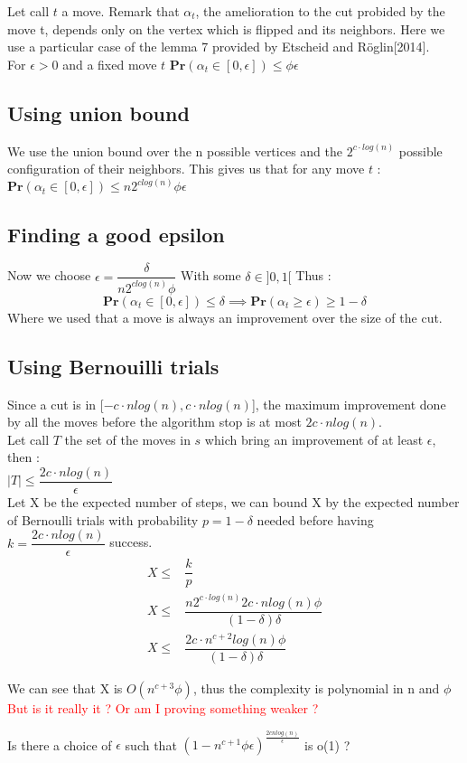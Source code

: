 \documentclass[12pt]{article}
\begin{document}
Let call $t$ a move. Remark that $\alpha_t$, the amelioration to the cut probided by the move t, depends only on the vertex which is flipped and its neighbors. 
Here we use a particular case of the lemma 7 provided by Etscheid and Röglin[2014]. \\ 
For $\epsilon > 0$ and a fixed move $t$ $\mathbf{Pr}(\alpha_t \in [0,\epsilon]) \leq \phi \epsilon$ \\

\subsection{Using union bound}

We use the union bound over the n possible vertices and the $2^{c \cdot log(n)}$ possible configuration of their neighbors. This gives us that for any move $t$ : \\
 $\mathbf{Pr}(\alpha_t \in [0,\epsilon]) \leq n2^{clog(n)}\phi \epsilon$ \\
 
 \subsection{Finding a good epsilon}
 Now we choose $\epsilon = \dfrac{\delta}{n2^{clog(n)}\phi}$ With some $\delta \in ]0,1[$ Thus :\\
 \begin{equation}
 \mathbf{Pr}(\alpha_t \in [0,\epsilon]) \leq  \delta \implies  \mathbf{Pr}(\alpha_t \geq \epsilon) \geq 1 - \delta
 \end{equation}
Where we used that a move is always an improvement over the size of the cut.

\subsection{Using Bernouilli trials}

Since a cut is in [$-c\cdot nlog(n), c \cdot nlog(n)$], the maximum improvement done by all the moves before the algorithm stop is at most $2c\cdot nlog(n)$. \\
Let call $T$ the set of the moves in $s$ which bring an improvement of at least $\epsilon$, then : \\
 $|T| \leq \dfrac{2c\cdot nlog(n)}{\epsilon}$ \\
 Let X be the expected number of steps, we can bound X by the expected number of Bernoulli trials with probability $p = 1 - \delta$ needed before having  $k = \dfrac{2c\cdot nlog(n)}{\epsilon}$ success. \\
 \begin{equation}
 \begin{split}
 X \leq & \dfrac{k}{p}\\
X \leq &\dfrac{n2^{c \cdot log(n)} 2c \cdot nlog(n)\phi}{(1 - \delta) \delta }\\
X \leq &\dfrac{2c \cdot n^{c+2} log(n)\phi}{(1 -  \delta) \delta}
\end{split}
\end{equation}


We can see that X is $O(n^{c+3}\phi)$, thus the complexity is polynomial in n and $\phi$\\
\textcolor{red}{But is it really it ? Or am I proving something weaker ?}

Is there a choice of $\epsilon$ such that $(1- n^{c+1}\phi \epsilon)^{\frac{2cnlog(n)}{\epsilon}}$ is o(1) ?
\end{document}
